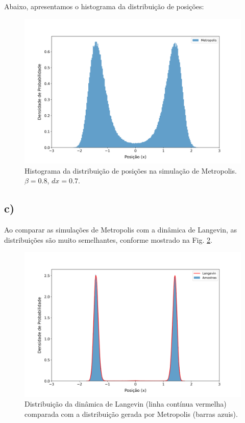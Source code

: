 \documentclass[a4paper, 12pt]{article}
\begin{document}
Abaixo, apresentamos o histograma da distribuição de posições:
\begin{figure}[H]
    \centering
    \includegraphics[scale=0.39]{Q2_b2.png}
    \caption{Histograma da distribuição de posições na simulação de Metropolis. \(\beta = 0.8\), \(dx = 0.7\).}
    \label{fig:Q2_b2}
\end{figure}

\subsection*{c)}

Ao comparar as simulações de Metropolis com a dinâmica de Langevin, as distribuições são muito semelhantes, conforme mostrado na Fig. \ref{fig:Q2_c}.

\begin{figure}[H]
    \centering
    \includegraphics[scale=0.39]{Q2_c.png}
    \caption{Distribuição da dinâmica de Langevin (linha contínua vermelha) comparada com a distribuição gerada por Metropolis (barras azuis).}
    \label{fig:Q2_c}
\end{figure}
\end{document}
